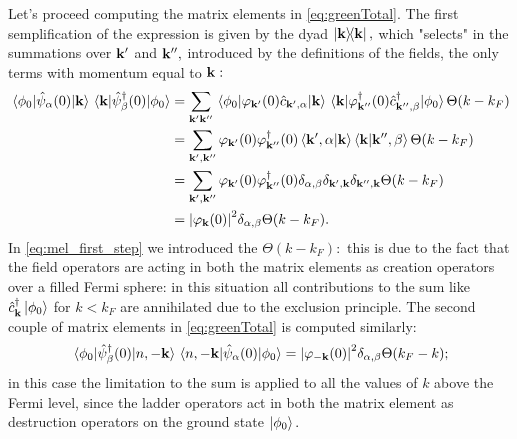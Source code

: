 \documentclass[a4paper]{article}
\begin{document}
\noindent Let's proceed computing the matrix elements in \eqref{eq:greenTotal}.
The first semplification of the expression is given by the dyad $\dyad{\vb{k}}{\vb{k}},$ which "selects" in the summations over $\vb{k}'$ and $\vb{k}'',$ introduced by the definitions of the fields, the only terms with momentum equal to $\vb{k}:$
\begin{align}
\mel{\phi_0}{\hat{\psi}_\alpha(0)}{\vb{k}}\mel{\vb{k}}{\hat{\psi}^\dag_\beta(0)}{\phi_0} &= \sum_{\vb{k}'\vb{k}''}\mel{\phi_0}{\varphi_{\vb{k}'}(0)\hat{c}_{\vb{k}',\alpha}}{\vb{k}} \mel{\vb{k}}{\varphi^\dag_{\vb{k}''}(0)\hat{c}^\dag_{\vb{k}'',\beta}}{\phi_0}\Theta(k - k_F) \label{eq:mel_first_step}\\
&=\sum_{\vb{k}',\vb{k}''} \varphi_{\vb{k}'}(0)\varphi^\dag_{\vb{k}''}(0)\braket{\vb{k}',\alpha}{\vb{k}}\braket{\vb{k}}{\vb{k}'',\beta}\Theta(k - k_F)\\
&=\sum_{\vb{k}',\vb{k}''} \varphi_{\vb{k}'}(0)\varphi^\dag_{\vb{k}''}(0) \delta_{\alpha,\beta}\delta_{\vb{k}',\vb{k}}\delta_{\vb{k}'',\vb{k}}\Theta(k - k_F)\\
&=\abs{\varphi_{\vb{k}}(0)}^2 \delta_{\alpha,\beta}\Theta(k-k_F).
\end{align}
In \eqref{eq:mel_first_step} we introduced the $\Theta(k - k_F):$ this is due to the fact that the field operators are acting in both the matrix elements as creation operators over a filled Fermi sphere: in this situation all contributions to the sum like $\hat{c}^\dag_{\vb{k}}\ket{\phi_0}$ for $k <k_F$ are annihilated due to the exclusion principle.
The second couple of matrix elements in \eqref{eq:greenTotal} is computed similarly:
\begin{equation}
\mel{\phi_0}{\hat{\psi}^\dag_\beta(0)}{n,-\vb{k}}\mel{n,-\vb{k}}{\hat{\psi}_\alpha(0)}{\phi_0} = \abs{\varphi_{-\vb{k}}(0)}^2\delta_{\alpha,\beta} \Theta(k_F - k);
\end{equation}
in this case the limitation to the sum is applied to all the values of $k$ above the Fermi level, since the ladder operators act in both the matrix element as destruction operators on the ground state $\ket{\phi_0}.$
\end{document}
